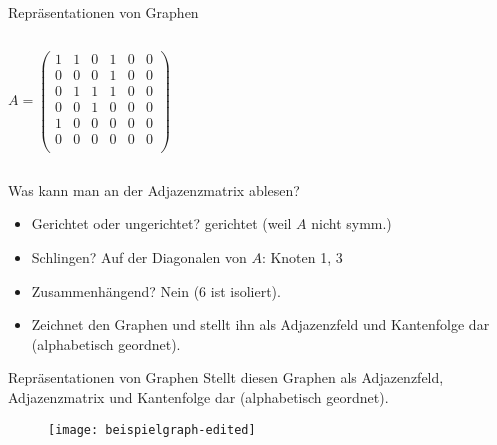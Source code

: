\begin{frame}{Repräsentationen von Graphen}
\begin{columns}
$$ A = 
\begin{pmatrix} 
1 & 1 & 0 & 1 & 0 & 0 \\ 
0 & 0 & 0 & 1 & 0 & 0 \\ 
0 & 1 & 1 & 1 & 0 & 0 \\ 
0 & 0 & 1 & 0 & 0 & 0 \\
1 & 0 & 0 & 0 & 0 & 0 \\
0 & 0 & 0 & 0 & 0 & 0 \\
\end{pmatrix} $$

\end{columns}

\bigskip
Was kann man an der Adjazenzmatrix ablesen?
\begin{itemize}
\item Gerichtet oder ungerichtet? \pause \impl gerichtet (weil $A$ nicht symm.) \pause
\item Schlingen?  \pause \impl Auf der Diagonalen von $A$: \quad Knoten 1, 3 \pause
\item Zusammenhängend? \pause \impl Nein (6 ist isoliert). 
\item Zeichnet den Graphen und stellt ihn als Adjazenzfeld und Kantenfolge dar (alphabetisch geordnet).
\end{itemize}
\end{frame}

\begin{frame}{Repräsentationen von Graphen}
	Stellt diesen Graphen als Adjazenzfeld, Adjazenzmatrix und Kantenfolge dar (alphabetisch geordnet). \vspace{-.3\baselineskip}
	\begin{figure}[htp]
		\centering
		\texttt{[image: beispielgraph-edited]}
	\end{figure}
\end{frame}
	
